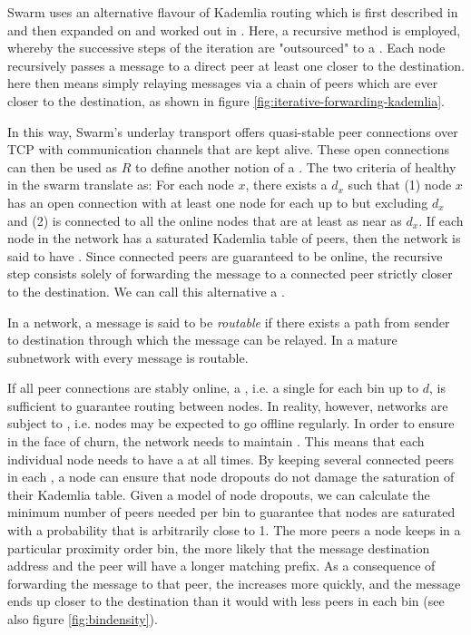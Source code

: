 Swarm uses an alternative flavour of Kademlia routing which is first described in \cite{heep2010r} and then expanded on and worked out in \cite{tronetal2019-network}. Here, a recursive method is employed, whereby the successive steps of the iteration are "outsourced" to a .
Each node recursively passes a message to a direct peer at least one  closer to the destination.  here then means simply relaying messages via a chain of peers which are ever closer to the destination, as shown in figure \ref{fig:iterative-forwarding-kademlia}.


In this way, Swarm's underlay transport offers quasi-stable peer connections over TCP with communication channels that are kept alive. These open connections can then be used as $R$ to define another notion of a . The two criteria of healthy  in the swarm translate as: For each node $x$, there exists a  $d_x$ such that (1) node $x$ has an open connection with at least one node for each  up to but excluding $d_x$ and (2) is connected to all the online nodes that are at least as near as $d_x$. If each node in the network has a saturated Kademlia table of peers, then the network is said to have . Since connected peers are guaranteed to be online, the recursive step consists solely of forwarding the message to a connected peer strictly closer to the destination. We can call this alternative a .


In a  network, a message is said to be \emph{routable} if there exists a path from sender to destination through which the message can be relayed. In a mature subnetwork with  every message is routable. 

If all peer connections are stably online, a , i.e. a single  for each bin up to $d$, is sufficient to guarantee routing between nodes. In reality, however, networks are subject to , i.e. nodes may be expected to go offline regularly. In order to ensure  in the face of churn, the network needs to maintain . This means that each individual node needs to have a  at all times. By keeping several connected peers in each , a node can ensure that node dropouts do not damage the saturation of their Kademlia table. Given a model of node dropouts, we can calculate the minimum number of peers needed per bin to guarantee that nodes are saturated with a probability that is arbitrarily close to 1. The more peers a node keeps in a particular proximity order bin, the more likely that the message destination address and the peer will have a longer matching prefix. As a consequence of forwarding the message to that peer, the  increases more quickly, and the message ends up closer to the destination than it would with less peers in each bin (see also figure \ref{fig:bindensity}).



